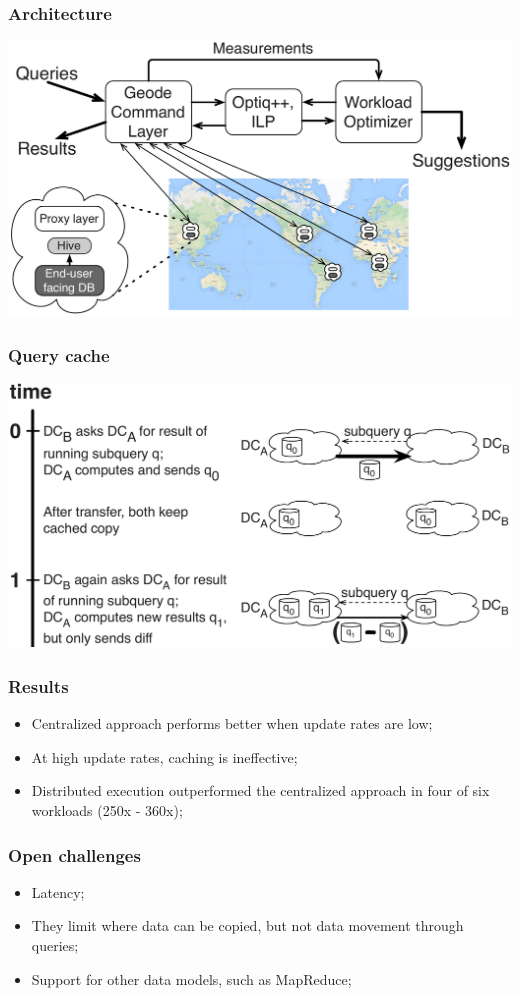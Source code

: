 \documentclass{beamer}
\begin{document}
\begin{frame}
	\frametitle{Architecture}

	\includegraphics[width=\textwidth]{./images/architecture.png}
\end{frame}

\begin{frame}
	\frametitle{Query cache}

	\includegraphics[width=\textwidth]{./images/geode-cache.png}
\end{frame}

\begin{frame}
	\frametitle{Results}

	\begin{itemize}
		\item Centralized approach performs better when update rates are low;
		\item At high update rates, caching is ineffective;
		\item Distributed execution outperformed the centralized approach in four of six workloads (250x - 360x);
	\end{itemize}
\end{frame}

\begin{frame}
	\frametitle{Open challenges}

	\begin{itemize}
		\item Latency;
		\item They limit where data can be copied, but not data movement through queries;
		\item Support for other data models, such as MapReduce;
	\end{itemize}
\end{frame}
\end{document}
